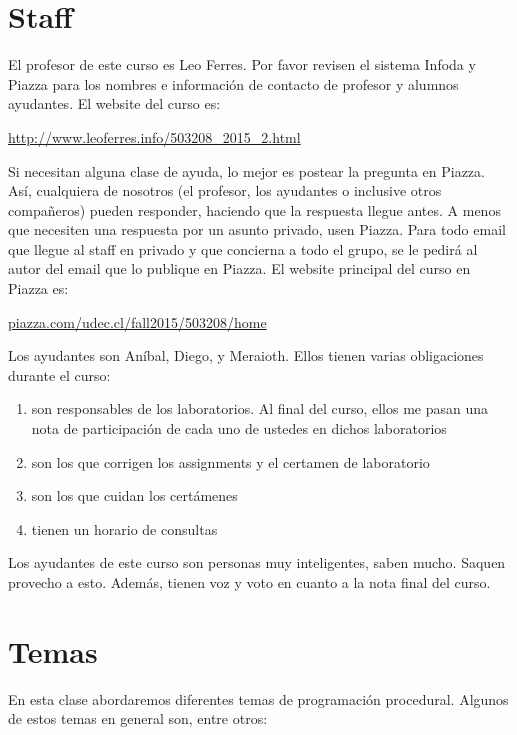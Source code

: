 \documentclass[11pt]{article}
\begin{document}
\section{Staff}
\label{sec:staff}

El profesor de este curso es Leo Ferres. Por favor revisen el sistema
Infoda y Piazza para los nombres e informaci\'on de contacto de profesor
y alumnos ayudantes.
\newpage
El website del curso es:

 \begin{center}
\url{http://www.leoferres.info/503208_2015_2.html}
\end{center}

Si necesitan alguna clase de ayuda, lo mejor es postear la pregunta en
Piazza. As\'i, cualquiera de nosotros (el profesor, los ayudantes o
inclusive otros compa\~neros) pueden responder, haciendo que la
respuesta llegue antes. A menos que necesiten una respuesta por un
asunto privado, usen Piazza. Para todo email que llegue al staff en
privado y que concierna a todo el grupo, se le pedir\'a al autor del
email que lo publique en Piazza. El website principal del curso en
Piazza es:

 \begin{center}
\url{piazza.com/udec.cl/fall2015/503208/home}
\end{center}

Los ayudantes son An\'ibal, Diego, y Meraioth. Ellos tienen varias
obligaciones durante el curso:

\begin{enumerate}
\item son responsables de los laboratorios. Al final del curso, ellos
  me pasan una nota de participaci\'on de cada uno de ustedes en dichos
  laboratorios
\item son los que corrigen los assignments y el certamen de laboratorio
\item son los que cuidan los cert\'amenes
\item tienen un horario de consultas
\end{enumerate}

Los ayudantes de este curso son personas muy inteligentes, saben
mucho. Saquen provecho a esto. Adem\'as, tienen voz y voto en cuanto a
la nota final del curso.

\section{Temas}
\label{sec:topics}

En esta clase abordaremos diferentes temas de programaci\'on
procedural. Algunos de estos temas en general son, entre otros:
\end{document}
